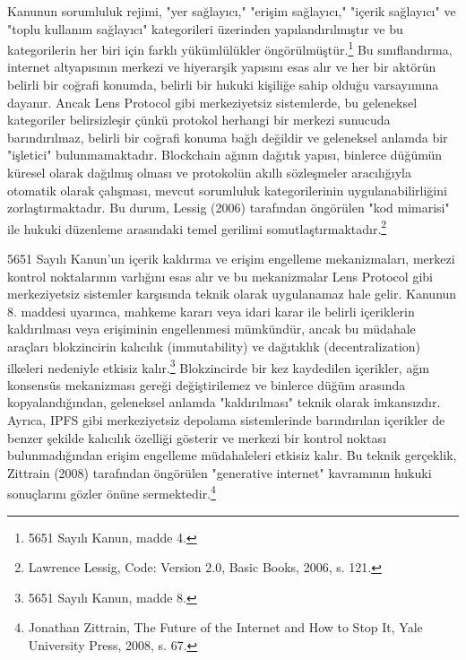 \documentclass[11pt,a4paper]{article}
\begin{document}
Kanunun sorumluluk rejimi, "yer sağlayıcı," "erişim sağlayıcı," "içerik sağlayıcı" ve "toplu kullanım sağlayıcı" kategorileri üzerinden yapılandırılmıştır ve bu kategorilerin her biri için farklı yükümlülükler öngörülmüştür.\footnote{5651 Sayılı Kanun, madde 4.} Bu sınıflandırma, internet altyapısının merkezi ve hiyerarşik yapısını esas alır ve her bir aktörün belirli bir coğrafi konumda, belirli bir hukuki kişiliğe sahip olduğu varsayımına dayanır. Ancak Lens Protocol gibi merkeziyetsiz sistemlerde, bu geleneksel kategoriler belirsizleşir çünkü protokol herhangi bir merkezi sunucuda barındırılmaz, belirli bir coğrafi konuma bağlı değildir ve geleneksel anlamda bir "işletici" bulunmamaktadır. Blockchain ağının dağıtık yapısı, binlerce düğümün küresel olarak dağılmış olması ve protokolün akıllı sözleşmeler aracılığıyla otomatik olarak çalışması, mevcut sorumluluk kategorilerinin uygulanabilirliğini zorlaştırmaktadır. Bu durum, Lessig (2006) tarafından öngörülen "kod mimarisi" ile hukuki düzenleme arasındaki temel gerilimi somutlaştırmaktadır.\footnote{Lawrence Lessig, Code: Version 2.0, Basic Books, 2006, s. 121.}

5651 Sayılı Kanun'un içerik kaldırma ve erişim engelleme mekanizmaları, merkezi kontrol noktalarının varlığını esas alır ve bu mekanizmalar Lens Protocol gibi merkeziyetsiz sistemler karşısında teknik olarak uygulanamaz hale gelir. Kanunun 8. maddesi uyarınca, mahkeme kararı veya idari karar ile belirli içeriklerin kaldırılması veya erişiminin engellenmesi mümkündür, ancak bu müdahale araçları blokzincirin kalıcılık (immutability) ve dağıtıklık (decentralization) ilkeleri nedeniyle etkisiz kalır.\footnote{5651 Sayılı Kanun, madde 8.} Blokzincirde bir kez kaydedilen içerikler, ağın konsensüs mekanizması gereği değiştirilemez ve binlerce düğüm arasında kopyalandığından, geleneksel anlamda "kaldırılması" teknik olarak imkansızdır. Ayrıca, IPFS gibi merkeziyetsiz depolama sistemlerinde barındırılan içerikler de benzer şekilde kalıcılık özelliği gösterir ve merkezi bir kontrol noktası bulunmadığından erişim engelleme müdahaleleri etkisiz kalır. Bu teknik gerçeklik, Zittrain (2008) tarafından öngörülen "generative internet" kavramının hukuki sonuçlarını gözler önüne sermektedir.\footnote{Jonathan Zittrain, The Future of the Internet and How to Stop It, Yale University Press, 2008, s. 67.}
\end{document}
